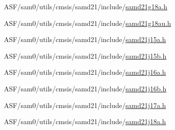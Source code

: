\begin{DoxyCompactItemize}
A\+S\+F/sam0/utils/cmsis/samd21/include/\mbox{\hyperlink{samd21g18a_8h}{samd21g18a.\+h}}\item 
A\+S\+F/sam0/utils/cmsis/samd21/include/\mbox{\hyperlink{samd21g18au_8h}{samd21g18au.\+h}}\item 
A\+S\+F/sam0/utils/cmsis/samd21/include/\mbox{\hyperlink{samd21j15a_8h}{samd21j15a.\+h}}\item 
A\+S\+F/sam0/utils/cmsis/samd21/include/\mbox{\hyperlink{samd21j15b_8h}{samd21j15b.\+h}}\item 
A\+S\+F/sam0/utils/cmsis/samd21/include/\mbox{\hyperlink{samd21j16a_8h}{samd21j16a.\+h}}\item 
A\+S\+F/sam0/utils/cmsis/samd21/include/\mbox{\hyperlink{samd21j16b_8h}{samd21j16b.\+h}}\item 
A\+S\+F/sam0/utils/cmsis/samd21/include/\mbox{\hyperlink{samd21j17a_8h}{samd21j17a.\+h}}\item 
A\+S\+F/sam0/utils/cmsis/samd21/include/\mbox{\hyperlink{samd21j18a_8h}{samd21j18a.\+h}}\end{DoxyCompactItemize}
